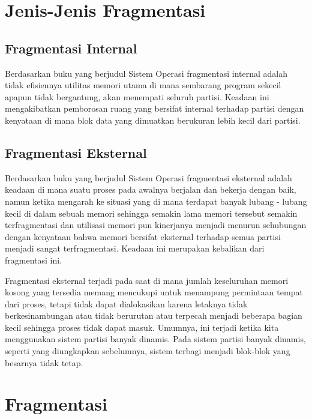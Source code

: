 
\section{Jenis-Jenis Fragmentasi}
\subsection{Fragmentasi Internal}
Berdasarkan buku yang berjudul Sistem Operasi \cite{pangera2005sistem} fragmentasi internal adalah tidak efisiennya utilitas memori utama di mana sembarang program sekecil apapun tidak bergantung, akan menempati seluruh partisi. Keadaan ini mengakibatkan pemborosan ruang yang bersifat internal terhadap partisi dengan kenyataan di mana blok data yang dimuatkan berukuran lebih kecil dari partisi.


\subsection{Fragmentasi Eksternal}
Berdasarkan buku yang berjudul Sistem Operasi \cite{pangera2005sistem} fragmentasi eksternal adalah keadaan di mana suatu proses pada awalnya berjalan dan bekerja dengan baik, namun ketika mengarah ke situasi yang di mana terdapat banyak lubang - lubang kecil di dalam sebuah memori sehingga semakin lama memori tersebut semakin terfragmentasi dan utilisasi memori pun kinerjanya menjadi menurun sehubungan dengan kenyataan bahwa memori bersifat eksternal terhadap semua partisi menjadi sangat terfragmentasi. Keadaan ini merupakan kebalikan dari fragmentasi ini.

Fragmentasi eksternal terjadi pada saat di mana jumlah keseluruhan memori kosong yang tersedia memang mencukupi untuk menampung permintaan tempat dari proses, tetapi tidak dapat dialokasikan karena letaknya tidak berkesinambungan atau tidak berurutan atau terpecah menjadi beberapa bagian kecil sehingga proses tidak dapat masuk. 
Umumnya, ini terjadi ketika kita menggunakan sistem partisi banyak dinamis. Pada sistem partisi banyak dinamis, seperti yang diungkapkan sebelumnya, sistem terbagi menjadi blok-blok yang besarnya tidak tetap.


\section{Fragmentasi}
